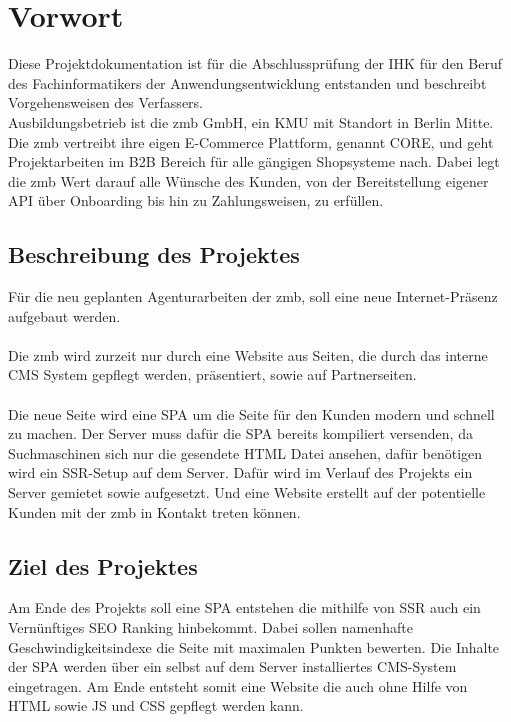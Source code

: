 \documentclass[11pt,a4paper]{article}
\begin{document}
\section{Vorwort}
Diese Projektdokumentation ist für die Abschlussprüfung der IHK für den Beruf des Fachinformatikers der Anwendungsentwicklung entstanden und beschreibt Vorgehensweisen des Verfassers.\\
Ausbildungsbetrieb ist die zmb GmbH, ein \acs{KMU} mit Standort in Berlin Mitte.
Die zmb vertreibt ihre eigen E-Commerce Plattform, genannt CORE, und geht Projektarbeiten im \acs{B2B} Bereich für alle gängigen Shopsysteme nach.  
Dabei legt die zmb Wert darauf alle Wünsche des Kunden, von der Bereitstellung eigener API über Onboarding bis hin zu Zahlungsweisen, zu erfüllen. 
\subsection{Beschreibung des Projektes}
Für die neu geplanten Agenturarbeiten der zmb, soll eine neue Internet-Präsenz aufgebaut werden.\\\\
Die zmb wird zurzeit nur durch eine Website aus Seiten, die durch das interne CMS System gepflegt werden, präsentiert, sowie auf Partnerseiten.\\\\
Die neue Seite wird eine \acs{SPA} um die Seite für den Kunden modern und schnell zu machen.  
Der Server muss dafür die \acs{SPA} bereits kompiliert versenden, da Suchmaschinen sich nur die gesendete HTML Datei ansehen, dafür benötigen wird ein \acs{SSR}-Setup auf dem Server.
Dafür wird im Verlauf des Projekts ein Server gemietet sowie aufgesetzt. Und eine Website erstellt auf der potentielle Kunden mit der zmb in Kontakt treten können.  
\subsection{Ziel des Projektes}
Am Ende des Projekts soll eine \acs{SPA} entstehen die mithilfe von \acs{SSR} auch ein Vernünftiges SEO Ranking hinbekommt. Dabei sollen namenhafte Geschwindigkeitsindexe die Seite mit maximalen Punkten bewerten.
Die Inhalte der \acs{SPA} werden über ein selbst auf dem Server installiertes CMS-System eingetragen.
Am Ende entsteht somit eine Website die auch ohne Hilfe von HTML sowie JS und CSS gepflegt werden kann.
\end{document}
